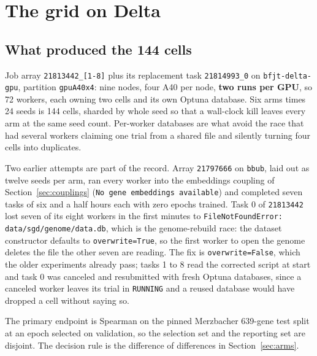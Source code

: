 
\section{The grid on Delta}
\label{sec:preliminary}

\subsection{What produced the 144 cells}

Job array \texttt{21813442\_[1-8]} plus its replacement task \texttt{21814993\_0} on
\texttt{bfjt-delta-gpu}, partition \texttt{gpuA40x4}: nine nodes, four A40 per node,
\textbf{two runs per GPU}, so 72 workers, each owning two cells and its own Optuna database.
Six arms times 24 seeds is 144 cells, sharded by whole seed so that a wall-clock kill leaves
every arm at the same seed count. Per-worker databases are what avoid the race that had
several workers claiming one trial from a shared file and silently turning four cells into
duplicates.

Two earlier attempts are part of the record. Array \texttt{21797666} on \texttt{bbub}, laid
out as twelve seeds per arm, ran every worker into the embeddings coupling of
Section~\ref{sec:couplings} (\texttt{No gene embeddings available}) and completed seven
tasks of six and a half hours each with zero epochs trained. Task 0 of \texttt{21813442}
lost seven of its eight workers in the first minutes to
\texttt{FileNotFoundError: data/sgd/genome/data.db}, which is the genome-rebuild race: the
dataset constructor defaults to \texttt{overwrite=True}, so the first worker to open the
genome deletes the file the other seven are reading. The fix is \texttt{overwrite=False},
which the older experiments already pass; tasks 1 to 8 read the corrected script at start
and task 0 was canceled and resubmitted with fresh Optuna databases, since a canceled
worker leaves its trial in \texttt{RUNNING} and a reused database would have dropped a cell
without saying so.

The primary endpoint is Spearman on the pinned Merzbacher 639-gene test split at an epoch
selected on validation, so the selection set and the reporting set are disjoint. The
decision rule is the difference of differences in Section~\ref{sec:arms}.

